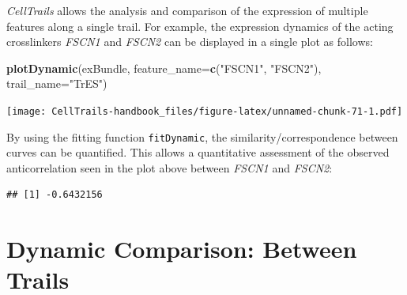 \documentclass[]{book}
\newenvironment{Shaded}{\begin{snugshade}}{\end{snugshade}}
\newcommand{\KeywordTok}[1]{\textcolor[rgb]{0.13,0.29,0.53}{\textbf{#1}}}
\newcommand{\DataTypeTok}[1]{\textcolor[rgb]{0.13,0.29,0.53}{#1}}
\newcommand{\StringTok}[1]{\textcolor[rgb]{0.31,0.60,0.02}{#1}}
\newcommand{\CommentTok}[1]{\textcolor[rgb]{0.56,0.35,0.01}{\textit{#1}}}
\newcommand{\OperatorTok}[1]{\textcolor[rgb]{0.81,0.36,0.00}{\textbf{#1}}}
\newcommand{\NormalTok}[1]{#1}
\theoremstyle{definition}
\theoremstyle{definition}
\theoremstyle{definition}
\theoremstyle{remark}
\begin{document}
\emph{CellTrails} allows the analysis and comparison of the expression
of multiple features along a single trail. For example, the expression
dynamics of the acting crosslinkers \emph{FSCN1} and \emph{FSCN2} can be
displayed in a single plot as follows:

\begin{Shaded}
\begin{Highlighting}[]
\KeywordTok{plotDynamic}\NormalTok{(exBundle, }\DataTypeTok{feature_name=}\KeywordTok{c}\NormalTok{(}\StringTok{"FSCN1"}\NormalTok{, }\StringTok{"FSCN2"}\NormalTok{), }\DataTypeTok{trail_name=}\StringTok{"TrES"}\NormalTok{)}
\end{Highlighting}
\end{Shaded}

\texttt{[image: CellTrails-handbook\_files/figure-latex/unnamed-chunk-71-1.pdf]}

By using the fitting function \texttt{fitDynamic}, the
similarity/correspondence between curves can be quantified. This allows
a quantitative assessment of the observed anticorrelation seen in the
plot above between \emph{FSCN1} and \emph{FSCN2}:

\begin{Shaded}
\end{Shaded}

\begin{verbatim}
## [1] -0.6432156
\end{verbatim}

\section{Dynamic Comparison: Between
Trails}\label{dynamic-comparison-between-trails}
\end{document}
